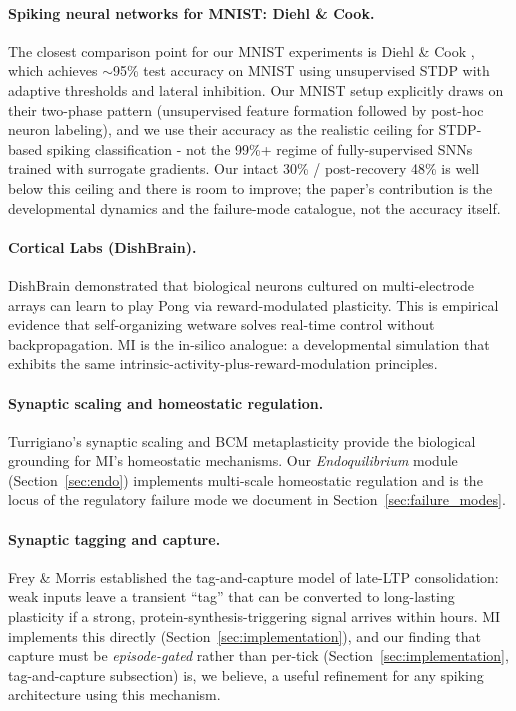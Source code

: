 \paragraph{Spiking neural networks for MNIST: Diehl \& Cook.}
The closest comparison point for our MNIST experiments is Diehl \& Cook \cite{diehl2015unsupervised}, which achieves $\sim$95\% test accuracy on MNIST using unsupervised STDP with adaptive thresholds and lateral inhibition. Our MNIST setup explicitly draws on their two-phase pattern (unsupervised feature formation followed by post-hoc neuron labeling), and we use their accuracy as the realistic ceiling for STDP-based spiking classification - not the 99\%+ regime of fully-supervised SNNs trained with surrogate gradients. Our intact 30\% / post-recovery 48\% is well below this ceiling and there is room to improve; the paper's contribution is the developmental dynamics and the failure-mode catalogue, not the accuracy itself.

\paragraph{Cortical Labs (DishBrain).}
DishBrain \cite{kagan2022dishbrain} demonstrated that biological neurons cultured on multi-electrode arrays can learn to play Pong via reward-modulated plasticity. This is empirical evidence that self-organizing wetware solves real-time control without backpropagation. MI is the in-silico analogue: a developmental simulation that exhibits the same intrinsic-activity-plus-reward-modulation principles.

\paragraph{Synaptic scaling and homeostatic regulation.}
Turrigiano's synaptic scaling \cite{turrigiano2008homeostatic,turrigiano1998activity} and BCM metaplasticity \cite{bienenstock1982bcm} provide the biological grounding for MI's homeostatic mechanisms. Our \emph{Endoquilibrium} module (Section~\ref{sec:endo}) implements multi-scale homeostatic regulation and is the locus of the regulatory failure mode we document in Section~\ref{sec:failure_modes}.

\paragraph{Synaptic tagging and capture.}
Frey \& Morris \cite{frey1997synaptic} established the tag-and-capture model of late-LTP consolidation: weak inputs leave a transient ``tag'' that can be converted to long-lasting plasticity if a strong, protein-synthesis-triggering signal arrives within hours. MI implements this directly (Section~\ref{sec:implementation}), and our finding that capture must be \emph{episode-gated} rather than per-tick (Section~\ref{sec:implementation}, tag-and-capture subsection) is, we believe, a useful refinement for any spiking architecture using this mechanism.

